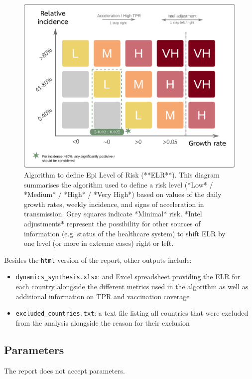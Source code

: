 \documentclass[]{book}
\begin{document}
\begin{figure}

{\centering \includegraphics[width=0.75\linewidth]{images/elr_algo} 

}

\caption{Algorithm to define Epi Level of Risk (**ELR**). This diagram summarises the algorithm used to define a risk level (*Low* / *Medium* / *High* / *Very High*) based on values of the daily growth rates, weekly incidence, and signs of acceleration in transmission. Grey squares indicate *Minimal* risk. *Intel adjustments* represent the possibility for other sources of information (e.g. status of the healthcare system) to shift ELR by one level (or more in extreme cases) right or left.}\label{fig:elr-algo}
\end{figure}

Besides the \texttt{html} version of the report, other outputs include:

\begin{itemize}
\item
  \texttt{dynamics\_synthesis.xlsx}: and Excel spreadsheet providing the ELR for each
  country alongside the different metrics used in the algorithm as well as
  additional information on TPR and vaccination coverage
\item
  \texttt{excluded\_countries.txt}: a text file listing all countries that were
  excluded from the analysis alongside the reason for their exclusion
\end{itemize}

\hypertarget{parameters-2}{%
\subsection{Parameters}\label{parameters-2}}

The report does not accept parameters.
\end{document}
